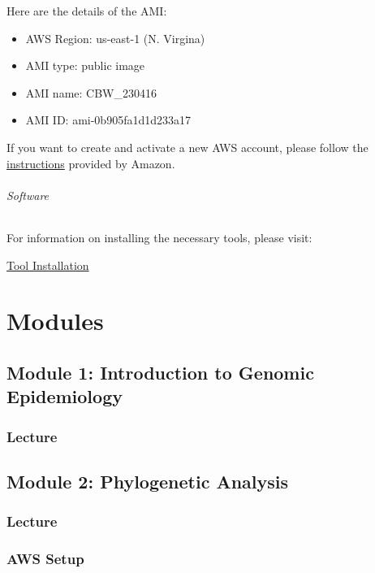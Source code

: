 \documentclass[
]{book}
\providecommand{\tightlist}{%
  \setlength{\itemsep}{0pt}\setlength{\parskip}{0pt}}
\begin{document}
Here are the details of the AMI:

\begin{itemize}
\tightlist
\item
  AWS Region: us-east-1 (N. Virgina)
\item
  AMI type: public image
\item
  AMI name: CBW\_230416
\item
  AMI ID: ami-0b905fa1d1d233a17
\end{itemize}

If you want to create and activate a new AWS account, please follow the \href{https://aws.amazon.com/premiumsupport/knowledge-center/create-and-activate-aws-account/}{instructions} provided by Amazon.

\paragraph{Software}\label{software}

For information on installing the necessary tools, please visit:

\href{https://bioinformaticsdotca.github.io/IDE_2023_tools}{Tool Installation}

\part{Modules}\label{part-modules}

\chapter{Module 1: Introduction to Genomic Epidemiology}\label{module-1-introduction-to-genomic-epidemiology}

\section{Lecture}\label{lecture}

\chapter{Module 2: Phylogenetic Analysis}\label{module-2-phylogenetic-analysis}

\section{Lecture}\label{lecture-1}

\section{AWS Setup}\label{aws-setup}
\end{document}

